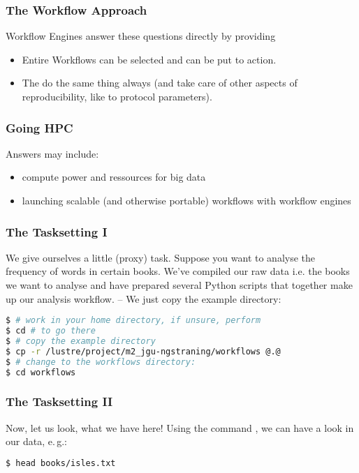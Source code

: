\begin{frame}
  \frametitle{The Workflow Approach}
  Workflow Engines answer these questions directly by providing
  \begin{itemize}
   \item Entire Workflows can be selected and can be put to action.
   \item The do the same thing always (and take care of other aspects of reproducibility, like to protocol parameters).
  \end{itemize}
\end{frame}

\begin{frame}
  \frametitle{Going HPC}
  \pause
  Answers may include:
  \begin{itemize}[<+->]
   \item compute power and ressources for big data
   \item launching scalable (and otherwise portable) workflows with workflow engines
  \end{itemize}
\end{frame}


\begin{frame}[fragile]
  \frametitle{The Tasksetting I}
  We give ourselves a little (proxy) task. Suppose you want to analyse the frequency of words in certain books.\newline
  \pause
  We’ve compiled our raw data i.e. the books we want to analyse and have prepared several Python scripts that together make up our analysis workflow. -- We just copy the example directory:
  \begin{lstlisting}[language=Bash, style=Shell]
$ # work in your home directory, if unsure, perform
$ cd # to go there
$ # copy the example directory
$ cp -r /lustre/project/m2_jgu-ngstraning/workflows @.@
$ # change to the workflows directory:
$ cd workflows
  \end{lstlisting}
\end{frame}

\begin{frame}[fragile]
  \frametitle{The Tasksetting II}
  Now, let us look, what we have here!\newline
  Using the command , we can have a look in our data, e.\,g.:
  \begin{lstlisting}[language=Bash, style=Shell, basicstyle=\ttfamily\footnotesize]
$ head books/isles.txt
  \end{lstlisting}
\end{frame}

